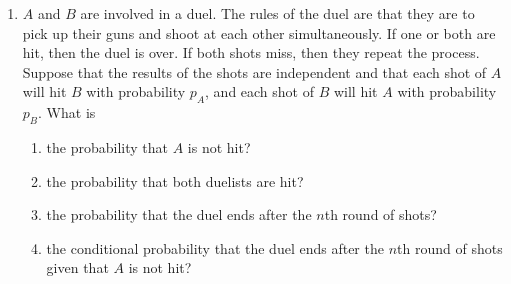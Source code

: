 \documentclass{article}
\begin{document}
\begin{enumerate}
\begin{enumerate}
        \item Suppose that Smith's wife has blue eyes. What is the probability that their first child will have blue eyes?
        \item If their first child has brown eyes, what is the probability that their next child will also have brown eyes?
    \end{enumerate}
    \item $A$ and $B$ are involved in a duel. The rules of the duel are that they are to pick up their guns and shoot at each other simultaneously. If one or both are hit, then the duel is over. If both shots miss, then they repeat the process. Suppose that the results of the shots are independent and that each shot of $A$ will hit $B$ with probability $p_A$, and each shot of $B$ will hit $A$ with probability $p_B$. What is
    \begin{enumerate}
        \item the probability that $A$ is not hit?
        \item the probability that both duelists are hit?
        \item the probability that the duel ends after the $n$th round of shots?
        \item the conditional probability that the duel ends after the $n$th round of shots given that $A$ is not hit?
    \end{enumerate}

\end{enumerate}
\end{document}
